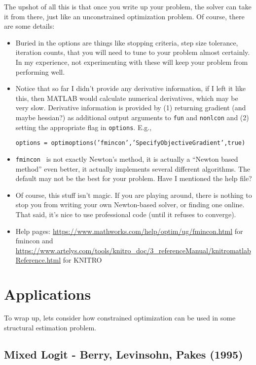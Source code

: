 \documentclass[twoside]{article}
\begin{document}
The upshot of all this is that once you write up your problem, the solver can take it from there, just like an unconstrained optimization problem. Of course, there are some details: 
\begin{itemize}
\item Buried in the options are things like stopping criteria, step size tolerance, iteration counts, that you will need to tune to your problem almost certainly. In my experience, not experimenting with these will keep your problem from performing well. 
\item Notice that so far I didn't provide any derivative information, if I left it like this, then MATLAB would calculate numerical derivatives, which may be very slow.  Derivative information is provided by (1) returning gradient (and maybe hessian?) as additional output arguments to {\tt fun} and {\tt nonlcon} and (2) setting the appropriate flag in {\tt options}. E.g., 
\begin{center}
{\tt options = optimoptions('fmincon','SpecifyObjectiveGradient',true) }
\end{center}

\item {\tt fmincon } is not exactly Newton's method, it is actually a ``Newton based method'' even better, it actually implements several different algorithms.  The default may not be the best for your problem.  Have I mentioned the help file?  

\item Of course, this stuff isn't magic. If you are playing around, there is nothing to stop you from writing your own Newton-based solver, or finding one online.  That said, it's nice to use professional code (until it refuses to converge). 

\item Help pages: \url{https://www.mathworks.com/help/optim/ug/fmincon.html} for fmincon and \url{https://www.artelys.com/tools/knitro_doc/3_referenceManual/knitromatlabReference.html} for KNITRO

\end{itemize}

\section{Applications}

To wrap up, lets consider how constrained optimization can be used in some structural estimation problem. 

\subsection{Mixed Logit - Berry, Levinsohn, Pakes (1995)}
\end{document}
